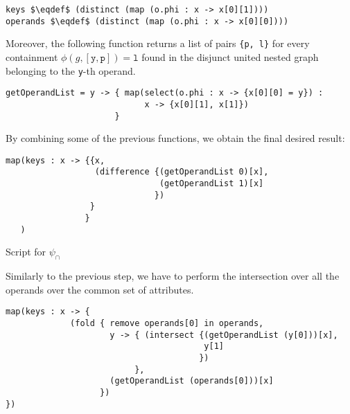 \begin{lstlisting}[language=script,mathescape=true]
keys $\eqdef$ (distinct (map (o.phi : x -> x[0][1])))
operands $\eqdef$ (distinct (map (o.phi : x -> x[0][0])))
\end{lstlisting}

Moreover, the following function returns a list of pairs \texttt{\{p, l\}} for every containment $\phi(g,[\texttt{y},\texttt{p}])=\texttt{l}$ found in the disjunct united nested graph belonging to the \texttt{y}-th operand.

\begin{lstlisting}[language=script]
getOperandList = y -> { map(select(o.phi : x -> {x[0][0] = y}) : 
                            x -> {x[0][1], x[1]}) 
                      }
\end{lstlisting}

By combining some of the previous functions, we obtain the final desired result:

\begin{lstlisting}[language=script,]
map(keys : x -> {{x, 
                  (difference {(getOperandList 0)[x], 
                               (getOperandList 1)[x]
                              })
                 }
                }
   )
\end{lstlisting}

{\par\LARGE Script for $\psi_\cap$\par}

Similarly to the previous step, we have to perform the intersection over all the operands over the common set of attributes.

\begin{lstlisting}[language=script]
map(keys : x -> {
             (fold { remove operands[0] in operands, 
                     y -> { (intersect {(getOperandList (y[0]))[x], 
                                        y[1]
                                       })
                          },
                     (getOperandList (operands[0]))[x]   
                   })
})
\end{lstlisting}

